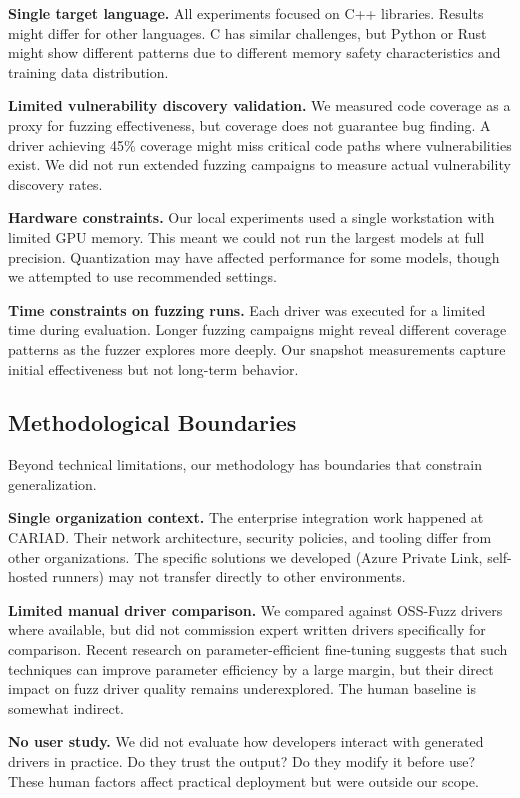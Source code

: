 \textbf{Single target language.} All experiments focused on C++ libraries. Results might differ for other languages. C has similar challenges, but Python or Rust might show different patterns due to different memory safety characteristics and training data distribution.

\textbf{Limited vulnerability discovery validation.} We measured code coverage as a proxy for fuzzing effectiveness, but coverage does not guarantee bug finding. A driver achieving 45\% coverage might miss critical code paths where vulnerabilities exist. We did not run extended fuzzing campaigns to measure actual vulnerability discovery rates.

\textbf{Hardware constraints.} Our local experiments used a single workstation with limited GPU memory. This meant we could not run the largest models at full precision. Quantization may have affected performance for some models, though we attempted to use recommended settings.

\textbf{Time constraints on fuzzing runs.} Each driver was executed for a limited time during evaluation. Longer fuzzing campaigns might reveal different coverage patterns as the fuzzer explores more deeply. Our snapshot measurements capture initial effectiveness but not long-term behavior.


\subsection{Methodological Boundaries}
\label{sec:discussion_methodology}

Beyond technical limitations, our methodology has boundaries that constrain generalization.

\textbf{Single organization context.} The enterprise integration work happened at CARIAD. Their network architecture, security policies, and tooling differ from other organizations. The specific solutions we developed (Azure Private Link, self-hosted runners) may not transfer directly to other environments.

\textbf{Limited manual driver comparison.} We compared against OSS-Fuzz drivers where available, but did not commission expert written drivers specifically for comparison. Recent research on parameter-efficient fine-tuning \cite{efficient_finetuning} suggests that such techniques can improve parameter efficiency by a large margin, but their direct impact on fuzz driver quality remains underexplored. The human baseline is somewhat indirect.

\textbf{No user study.} We did not evaluate how developers interact with generated drivers in practice. Do they trust the output? Do they modify it before use? These human factors affect practical deployment but were outside our scope.

